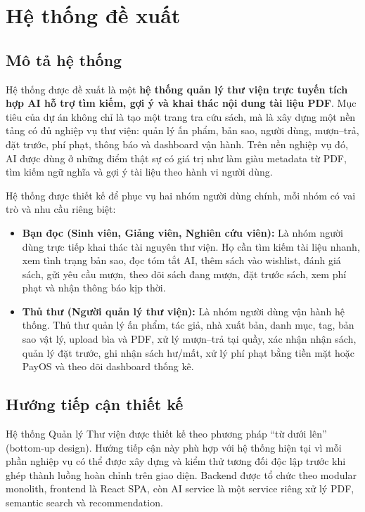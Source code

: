 \chapter{Hệ thống đề xuất}
\label{chap:HeThongDeXuat}

\section{Mô tả hệ thống}
\label{sec:MoTaHeThong}

Hệ thống được đề xuất là một \textbf{hệ thống quản lý thư viện trực tuyến tích hợp AI hỗ trợ tìm kiếm, gợi ý và khai thác nội dung tài liệu PDF}. Mục tiêu của dự án không chỉ là tạo một trang tra cứu sách, mà là xây dựng một nền tảng có đủ nghiệp vụ thư viện: quản lý ấn phẩm, bản sao, người dùng, mượn--trả, đặt trước, phí phạt, thông báo và dashboard vận hành. Trên nền nghiệp vụ đó, AI được dùng ở những điểm thật sự có giá trị như làm giàu metadata từ PDF, tìm kiếm ngữ nghĩa và gợi ý tài liệu theo hành vi người dùng.

Hệ thống được thiết kế để phục vụ hai nhóm người dùng chính, mỗi nhóm có vai trò và nhu cầu riêng biệt:
\begin{itemize}
    \item \textbf{Bạn đọc (Sinh viên, Giảng viên, Nghiên cứu viên):} Là nhóm người dùng trực tiếp khai thác tài nguyên thư viện. Họ cần tìm kiếm tài liệu nhanh, xem tình trạng bản sao, đọc tóm tắt AI, thêm sách vào wishlist, đánh giá sách, gửi yêu cầu mượn, theo dõi sách đang mượn, đặt trước sách, xem phí phạt và nhận thông báo kịp thời.

    \item \textbf{Thủ thư (Người quản lý thư viện):} Là nhóm người dùng vận hành hệ thống. Thủ thư quản lý ấn phẩm, tác giả, nhà xuất bản, danh mục, tag, bản sao vật lý, upload bìa và PDF, xử lý mượn--trả tại quầy, xác nhận nhận sách, quản lý đặt trước, ghi nhận sách hư/mất, xử lý phí phạt bằng tiền mặt hoặc PayOS và theo dõi dashboard thống kê.
\end{itemize}

\section{Hướng tiếp cận thiết kế}
\label{subsec:DesignApproach}

Hệ thống Quản lý Thư viện được thiết kế theo phương pháp ``từ dưới lên'' (bottom-up design). Hướng tiếp cận này phù hợp với hệ thống hiện tại vì mỗi phần nghiệp vụ có thể được xây dựng và kiểm thử tương đối độc lập trước khi ghép thành luồng hoàn chỉnh trên giao diện. Backend được tổ chức theo modular monolith, frontend là React SPA, còn AI service là một service riêng xử lý PDF, semantic search và recommendation.

